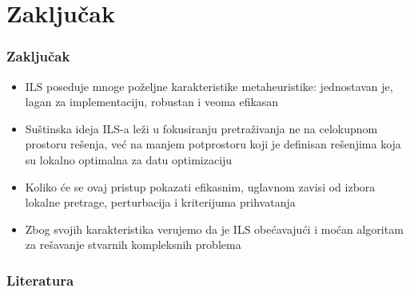 \documentclass{beamer}
\begin{document}
\section{Zaključak}
\begin{frame}[fragile]\frametitle{Zaključak}
	\begin{itemize}
		\item ILS poseduje mnoge poželjne karakteristike metaheuristike: jednostavan je, lagan za implementaciju, robustan i veoma efikasan
		\item Suštinska ideja ILS-a leži u fokusiranju pretraživanja ne na celokupnom prostoru rešenja, već na manjem potprostoru koji je definisan rešenjima koja su lokalno optimalna za datu optimizaciju
		\item  Koliko će se ovaj pristup pokazati efikasnim, uglavnom zavisi od izbora lokalne pretrage, perturbacija i kriterijuma prihvatanja
		\item Zbog svojih karakteristika verujemo da je ILS obećavajući i moćan algoritam za rešavanje stvarnih kompleksnih problema
	\end{itemize}

\end{frame}

\begin{frame}[fragile]\frametitle{Literatura}
	\thispagestyle{empty}

\end{frame}
\end{document}
